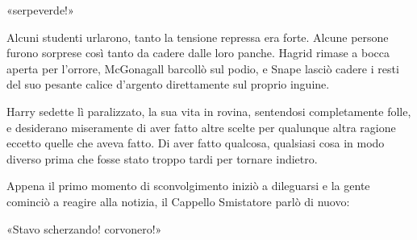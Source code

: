 «serpeverde!»

Alcuni studenti urlarono, tanto la tensione repressa era forte. Alcune persone furono sorprese così tanto da cadere dalle loro panche. Hagrid rimase a bocca aperta per l’orrore, McGonagall barcollò sul podio, e Snape lasciò cadere i resti del suo pesante calice d’argento direttamente sul proprio inguine.

Harry sedette lì paralizzato, la sua vita in rovina, sentendosi completamente folle, e desiderano miseramente di aver fatto altre scelte per qualunque altra ragione eccetto quelle che aveva fatto. Di aver fatto qualcosa, qualsiasi cosa in modo diverso prima che fosse stato troppo tardi per tornare indietro.

Appena il primo momento di sconvolgimento iniziò a dileguarsi e la gente cominciò a reagire alla notizia, il Cappello Smistatore parlò di nuovo:

«Stavo scherzando! corvonero!»





